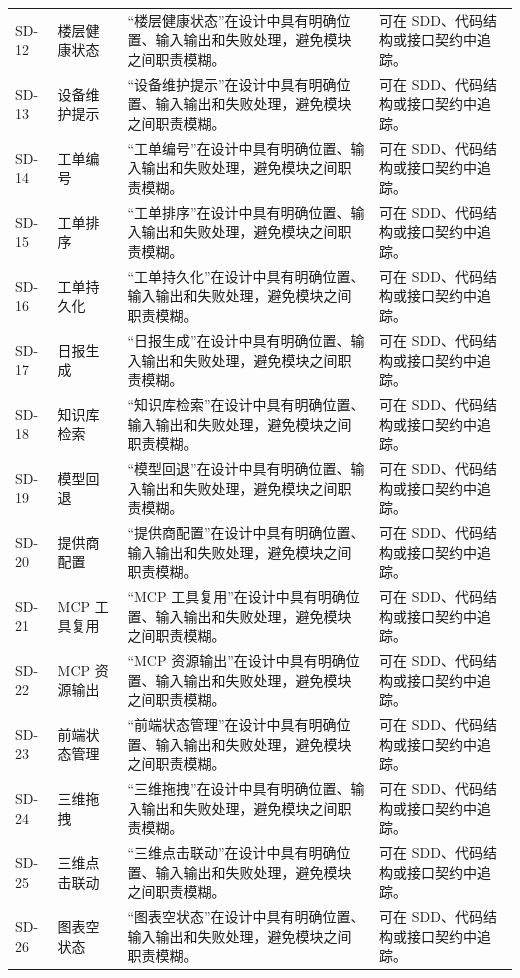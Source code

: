 \documentclass[12pt,a4paper]{ctexart}
\begin{document}
\begin{longtable}{L{1.7cm}L{3.2cm}L{6.4cm}L{4.0cm}}
SD-12 & 楼层健康状态 & “楼层健康状态”在设计中具有明确位置、输入输出和失败处理，避免模块之间职责模糊。 & 可在 SDD、代码结构或接口契约中追踪。 \\
SD-13 & 设备维护提示 & “设备维护提示”在设计中具有明确位置、输入输出和失败处理，避免模块之间职责模糊。 & 可在 SDD、代码结构或接口契约中追踪。 \\
SD-14 & 工单编号 & “工单编号”在设计中具有明确位置、输入输出和失败处理，避免模块之间职责模糊。 & 可在 SDD、代码结构或接口契约中追踪。 \\
SD-15 & 工单排序 & “工单排序”在设计中具有明确位置、输入输出和失败处理，避免模块之间职责模糊。 & 可在 SDD、代码结构或接口契约中追踪。 \\
SD-16 & 工单持久化 & “工单持久化”在设计中具有明确位置、输入输出和失败处理，避免模块之间职责模糊。 & 可在 SDD、代码结构或接口契约中追踪。 \\
SD-17 & 日报生成 & “日报生成”在设计中具有明确位置、输入输出和失败处理，避免模块之间职责模糊。 & 可在 SDD、代码结构或接口契约中追踪。 \\
SD-18 & 知识库检索 & “知识库检索”在设计中具有明确位置、输入输出和失败处理，避免模块之间职责模糊。 & 可在 SDD、代码结构或接口契约中追踪。 \\
SD-19 & 模型回退 & “模型回退”在设计中具有明确位置、输入输出和失败处理，避免模块之间职责模糊。 & 可在 SDD、代码结构或接口契约中追踪。 \\
SD-20 & 提供商配置 & “提供商配置”在设计中具有明确位置、输入输出和失败处理，避免模块之间职责模糊。 & 可在 SDD、代码结构或接口契约中追踪。 \\
SD-21 & MCP 工具复用 & “MCP 工具复用”在设计中具有明确位置、输入输出和失败处理，避免模块之间职责模糊。 & 可在 SDD、代码结构或接口契约中追踪。 \\
SD-22 & MCP 资源输出 & “MCP 资源输出”在设计中具有明确位置、输入输出和失败处理，避免模块之间职责模糊。 & 可在 SDD、代码结构或接口契约中追踪。 \\
SD-23 & 前端状态管理 & “前端状态管理”在设计中具有明确位置、输入输出和失败处理，避免模块之间职责模糊。 & 可在 SDD、代码结构或接口契约中追踪。 \\
SD-24 & 三维拖拽 & “三维拖拽”在设计中具有明确位置、输入输出和失败处理，避免模块之间职责模糊。 & 可在 SDD、代码结构或接口契约中追踪。 \\
SD-25 & 三维点击联动 & “三维点击联动”在设计中具有明确位置、输入输出和失败处理，避免模块之间职责模糊。 & 可在 SDD、代码结构或接口契约中追踪。 \\
SD-26 & 图表空状态 & “图表空状态”在设计中具有明确位置、输入输出和失败处理，避免模块之间职责模糊。 & 可在 SDD、代码结构或接口契约中追踪。 \\

\end{longtable}
\end{document}
